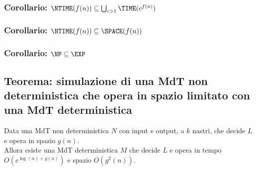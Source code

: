 \subsubsection{Corollario: $\NTIME(f(n)) \subseteq \bigcup_{c>1} \TIME(c^{f(n)})$}
\subsubsection{Corollario: $\NTIME(f(n)) \subseteq \SPACE(f(n))$}
\subsubsection{Corollario: $\NP \subseteq \EXP$}


\subsection{Teorema: simulazione di una MdT non deterministica che opera in spazio limitato con una MdT deterministica}
\label{theorem:non_deterministic_space_to_deterministic_time}
Data una MdT non deterministica $N$ con input e output, a $k$ nastri,
che decide $L$ e opera in spazio $g(n)$. \\
Allora esiste una MdT deterministica $M$ 
che decide $L$ e opera in tempo $O(c^{\log(n) + g(n)})$ e spazio $O(g^2(n))$.
